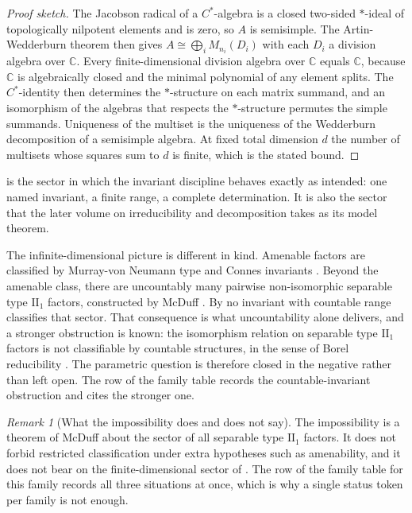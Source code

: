 \documentclass[11pt,letterpaper]{article}
\theoremstyle{definition}
\theoremstyle{remark}
\newtheorem{remark}[theorem]{Remark}
\begin{document}
\begin{proof}[Proof sketch]
The Jacobson radical of a $C^*$-algebra is a closed two-sided $*$-ideal of topologically nilpotent elements and is zero, so $A$ is semisimple. The Artin-Wedderburn theorem then gives $A \cong \bigoplus_i M_{n_i}(D_i)$ with each $D_i$ a division algebra over $\mathbb{C}$. Every finite-dimensional division algebra over $\mathbb{C}$ equals $\mathbb{C}$, because $\mathbb{C}$ is algebraically closed and the minimal polynomial of any element splits. The $C^*$-identity then determines the $*$-structure on each matrix summand, and an isomorphism of the algebras that respects the $*$-structure permutes the simple summands. Uniqueness of the multiset is the uniqueness of the Wedderburn decomposition of a semisimple algebra. At fixed total dimension $d$ the number of multisets whose squares sum to $d$ is finite, which is the stated bound.
\end{proof}

 is the sector in which the invariant discipline behaves exactly as intended: one named invariant, a finite range, a complete determination. It is also the sector that the later volume on irreducibility and decomposition takes as its model theorem.

The infinite-dimensional picture is different in kind. Amenable factors are classified by Murray-von Neumann type and Connes invariants \cite{vnalg}. Beyond the amenable class, there are uncountably many pairwise non-isomorphic separable type $\mathrm{II}_1$ factors, constructed by McDuff \cite{mcduff}. By  no invariant with countable range classifies that sector. That consequence is what uncountability alone delivers, and a stronger obstruction is known: the isomorphism relation on separable type $\mathrm{II}_1$ factors is not classifiable by countable structures, in the sense of Borel reducibility \cite{sasyk}. The parametric question is therefore closed in the negative rather than left open. The row of the family table records the countable-invariant obstruction and cites the stronger one.

\begin{remark}[What the impossibility does and does not say]
\label{rem:mcduff}
The impossibility is a theorem of McDuff \cite{mcduff} about the sector of all separable type $\mathrm{II}_1$ factors. It does not forbid restricted classification under extra hypotheses such as amenability, and it does not bear on the finite-dimensional sector of . The row of the family table for this family records all three situations at once, which is why a single status token per family is not enough.
\end{remark}
\end{document}
